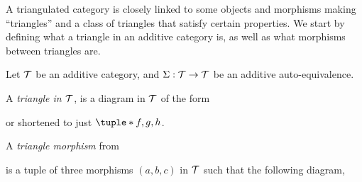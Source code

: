 A triangulated category is closely linked to some objects and morphisms making ``triangles'' and a class of triangles that satisfy certain properties. We start by defining what a triangle in an additive category is, as well as what morphisms between triangles are.

\begin{definition}[Triangles]
    \label{def:triangles}
    Let \( {\mathcal{T}} \) be an additive category, and \( \Sigma: {\mathcal{T}} \to {\mathcal{T}} \) be an additive auto-equivalence.

    A \emph{triangle in \( {\mathcal{T}} \)}, is a diagram in \( {\mathcal{T}} \) of the form
    \begin{center}
    \end{center}
    or shortened to just \( \tuple*{f, g, h} \).

    A \emph{triangle morphism} from
    \begin{center}
    \end{center}
    is a tuple of three morphisms \( (a, b, c) \) in \( {\mathcal{T}} \) such that the following diagram,
    \begin{center}
\end{center}
\end{definition}
